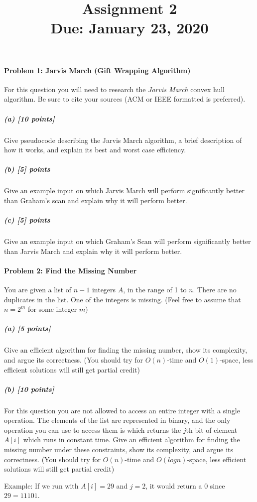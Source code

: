 \documentclass[11pt]{article}
\title{\bf Assignment 2 \\[2ex]
\rm\normalsize Due: January 23, 2020}
\date{}
\author{}
\begin{document}
\maketitle

\begin{center}
\end{center}

\paragraph{Problem 1: Jarvis March (Gift Wrapping Algorithm)}
For this question you will need to research the {\em Jarvis March} convex hull algorithm. Be sure to cite your sources (ACM or IEEE formatted is preferred).
\subparagraph{(a) [10 points]}
Give pseudocode describing the Jarvis March algorithm, a brief description of how it works, and explain its best and worst case efficiency.
\subparagraph{(b) [5] points}
Give an example input on which Jarvis March will perform significantly better than Graham's scan and explain why it will perform better.
\subparagraph{(c) [5] points}
Give an example input on which Graham's Scan will perform significantly better than Jarvis March and explain why it will perform better.

\paragraph{Problem 2: Find the Missing Number}
You are given a list of $n-1$ integers $A$, in the range of 1 to $n$. There are no duplicates in the list. One of the integers is missing.
(Feel free to assume that $n = 2^m$ for some integer $m$)
\subparagraph{(a) [5 points]}
Give an efficient algorithm for finding the missing number, show its complexity, and argue its correctness.
(You should try for $O(n)$-time and $O(1)$-space, less efficient solutions will still get partial credit)
\subparagraph{(b) [10 points]}
For this question you are not allowed to access an entire integer with a single operation. The elements of the list are represented in binary, and the only operation you can use to access them is  which returns the $j$th bit of element $A[i]$ which runs in constant time. Give an efficient algorithm for finding the missing number under these constraints, show its complexity, and argue its correctness.
(You should try for $O(n)$-time and $O(log n)$-space, less efficient solutions will still get partial credit)

Example: If we run  with $A[i]=29$ and $j=2$, it would return a $0$ since $29=11101$.
\end{document}

